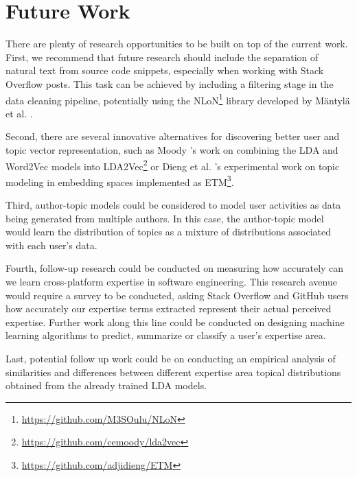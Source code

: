     \section{Future Work\label{sec:futurework}} 
    
        There are plenty of research opportunities to be built on top of the current work. First, we recommend that future research should include the separation of natural text from source code snippets, especially when working with Stack Overflow posts. This task can be achieved by including a filtering stage in the data cleaning pipeline, potentially using the  NLoN\footnote{\url{https://github.com/M3SOulu/NLoN}} library developed by M{\"a}ntyl{\"a} et al. \cite{mantyla2018natural}.
        
        Second, there are several innovative alternatives for discovering better user and topic vector representation, such as Moody \cite{moody2016mixing}'s work on combining the LDA and Word2Vec models into LDA2Vec\footnote{\url{https://github.com/cemoody/lda2vec}} or Dieng et al. \cite{dieng2019topic}'s experimental work on topic modeling in embedding spaces implemented as ETM\footnote{\url{https://github.com/adjidieng/ETM}}.
        
        Third, author-topic models \cite{rosen2012author} could be considered to model user activities as data being generated from multiple authors. In this case, the author-topic model would learn the distribution of topics as a mixture of distributions associated with each user's data. 
        
        Fourth, follow-up research could be conducted on measuring how accurately can we learn cross-platform expertise in software engineering. This research avenue would require a survey to be conducted, asking Stack Overflow and GitHub users how accurately our expertise terms extracted represent their actual perceived expertise. Further work along this line could be conducted on designing machine learning algorithms to predict, summarize or classify a user's expertise area.
        
        Last, potential follow up work could be on conducting an empirical analysis of similarities and differences between different expertise area topical distributions obtained from the already trained LDA models.
